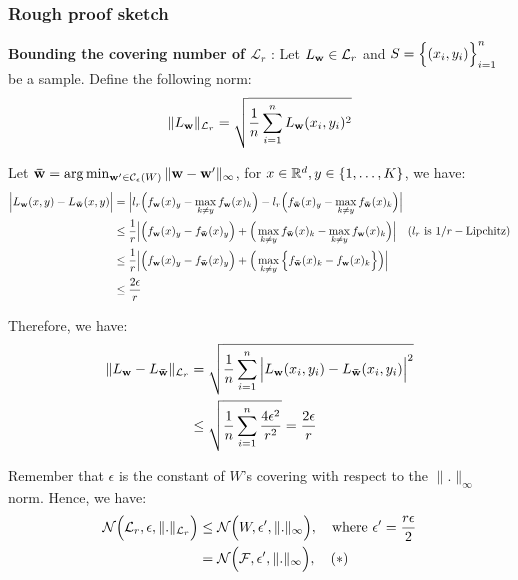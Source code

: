 \subsubsection{Rough proof sketch}
\textbf{Bounding the covering number of $\mathcal{L}_r$} : Let $L_{\bf w} \in \mathcal{L}_r$ and $S=\Big\{ (x_i, y_i) \Big\}_{i=1}^n$ be a sample. Define the following norm:
\begin{align*}
    \|L_{\bf w}\|_{\mathcal{L}_r} = \sqrt{
        \frac{1}{n} \sum_{i=1}^n L_{\bf w}(x_i, y_i)^2
    }
\end{align*}

\noindent Let ${\bf \bar w} = \arg\min_{{\bf w'} \in \mathcal{C}_\epsilon(W)}\| {\bf w}-{\bf w'} \|_\infty$, for $x\in\mathbb{R}^d, y \in \{1, \dots, K\}$, we have:
\begin{align*}
    \Big| L_{\bf w}(x, y) - L_{\bf \bar w}(x, y) \Big|
        &= \Big| 
            l_r\Big(  f_{\bf w}(x)_y - \max_{k\ne y} f_{\bf w}(x)_k  \Big) - l_r\Big(  f_{\bf \bar w}(x)_y - \max_{k\ne y} f_{\bf \bar w}(x)_k  \Big)
         \Big| \\
        &\le \frac{1}{r}\Big| 
            \Big( f_{\bf w}(x)_y - f_{\bf \bar w}(x)_y \Big) + \Big( \max_{k\ne y} f_{\bf \bar w}(x)_k - \max_{k\ne y} f_{\bf w}(x)_k \Big)
         \Big|\ \ \ (l_r \text{ is } 1/r-\text{Lipchitz}) \\
        &\le \frac{1}{r}\Big| 
            \Big( f_{\bf w}(x)_y - f_{\bf \bar w}(x)_y \Big) + \Big( \max_{k\ne y} \Big\{ f_{\bf \bar w}(x)_k - f_{\bf w}(x)_k \Big\} \Big)
         \Big| \\
        &\le \frac{2\epsilon}{r}
\end{align*}

\noindent Therefore, we have:
\begin{align*}
    \|L_{\bf w} - L_{\bf \bar w}\|_{\mathcal{L}_r} &= \sqrt{
        \frac{1}{n} \sum_{i=1}^n \Big| L_{\bf w}(x_i, y_i) - L_{\bf \bar w}(x_i, y_i) \Big|^2
    } \\
    &\le  \sqrt{
        \frac{1}{n} \sum_{i=1}^n \frac{4\epsilon^2}{r^2}
    } = \frac{2\epsilon}{r}
\end{align*}

\noindent Remember that $\epsilon$ is the constant of $W$'s covering with respect to the $\|.\|_\infty$ norm. Hence, we have:
\begin{align*}
    \mathcal{N}\bigRound{\mathcal{L}_r, \epsilon, \|.\|_{\mathcal{L}_r}} &\le \mathcal{N}\bigRound{W, \epsilon', \|.\|_\infty}, \ \ \ \text{where } \epsilon' = \frac{r\epsilon}{2} \\
        &= \mathcal{N}\bigRound{\F, \epsilon', \|.\|_\infty}, \ \ \ (*)
\end{align*}

